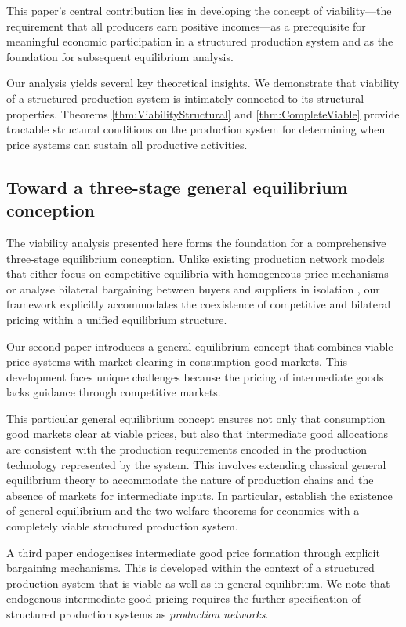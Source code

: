 \documentclass[11pt,fleqn]{article}
\begin{document}
This paper's central contribution lies in developing the concept of viability---the requirement that all producers earn positive incomes---as a prerequisite for meaningful economic participation in a structured production system and as the foundation for subsequent equilibrium analysis.

Our analysis yields several key theoretical insights. We demonstrate that viability of a structured production system is intimately connected to its structural properties. Theorems \ref{thm:ViabilityStructural} and \ref{thm:CompleteViable} provide tractable structural conditions on the production system for determining when price systems can sustain all productive activities.

\subsection{Toward a three-stage general equilibrium conception}

The viability analysis presented here forms the foundation for a comprehensive three-stage equilibrium conception. Unlike existing production network models that either focus on competitive equilibria with homogeneous price mechanisms \citep{BaqaeeFarhi2020} or analyse bilateral bargaining between buyers and suppliers in isolation \citep{Alviarez2026}, our framework explicitly accommodates the coexistence of competitive and bilateral pricing within a unified equilibrium structure. 

Our second paper \citep{GillesPesce-SP-2} introduces a general equilibrium concept that combines viable price systems with market clearing in consumption good markets. This development faces unique challenges because the pricing of intermediate goods lacks guidance through competitive markets. 

This particular general equilibrium concept ensures not only that consumption good markets clear at viable prices, but also that intermediate good allocations are consistent with the production requirements encoded in the production technology represented by the system. This involves extending classical general equilibrium theory to accommodate the nature of production chains and the absence of markets for intermediate inputs. In particular, \citet{GillesPesce-SP-2} establish the existence of general equilibrium and the two welfare theorems for economies with a completely viable structured production system.

A third paper \citep{GillesPesce-SP-3} endogenises intermediate good price formation through explicit bargaining mechanisms. This is developed within the context of a structured production system that is viable as well as in general equilibrium. We note that endogenous intermediate good pricing requires the further specification of structured production systems as \emph{production networks}. 
\end{document}

